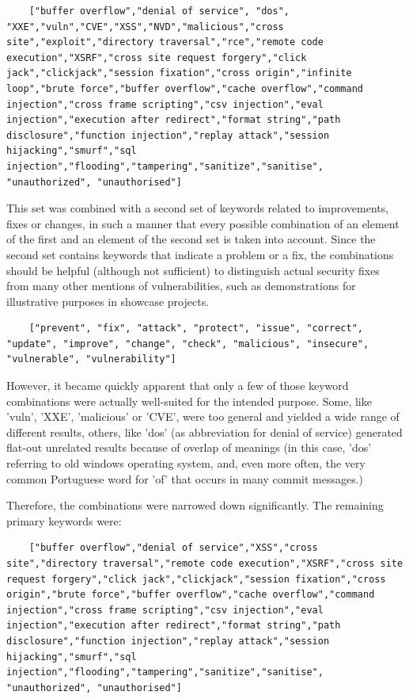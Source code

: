 \documentclass[
a4paper,
pagesize,
pdftex,
12pt,
ngerman,
fleqn,
final,
]{scrartcl}
\begin{document}
	\begin{lstlisting}
	["buffer overflow","denial of service", "dos", "XXE","vuln","CVE","XSS","NVD","malicious","cross site","exploit","directory traversal","rce","remote code execution","XSRF","cross site request forgery","click jack","clickjack","session fixation","cross origin","infinite loop","brute force","buffer overflow","cache overflow","command injection","cross frame scripting","csv injection","eval injection","execution after redirect","format string","path disclosure","function injection","replay attack","session hijacking","smurf","sql injection","flooding","tampering","sanitize","sanitise", "unauthorized", "unauthorised"]
	\end{lstlisting}
	This set was combined with a second set of keywords related to improvements, fixes or changes, in such a manner that every possible combination of an element of the first and an element of the second set is taken into account. Since the second set contains keywords that indicate a problem or a fix, the combinations should be helpful (although not sufficient) to distinguish actual security fixes from many other mentions of vulnerabilities, such as demonstrations for illustrative purposes in showcase projects.
	\begin{lstlisting}
	["prevent", "fix", "attack", "protect", "issue", "correct", "update", "improve", "change", "check", "malicious", "insecure", "vulnerable", "vulnerability"]
	\end{lstlisting}
	However, it became quickly apparent that only a few of those keyword combinations were actually well-suited for the intended purpose. Some, like 'vuln', 'XXE', 'malicious' or 'CVE', were too general and yielded a wide range of different results, others, like 'dos' (as abbreviation for denial of service) generated flat-out unrelated results because of overlap of meanings (in this case, 'dos' referring to old windows operating system, and, even more often, the very common Portuguese word for 'of' that occurs in many commit messages.)
	
	Therefore, the combinations were narrowed down significantly. The remaining primary keywords were:
	\begin{lstlisting}
	["buffer overflow","denial of service","XSS","cross site","directory traversal","remote code execution","XSRF","cross site request forgery","click jack","clickjack","session fixation","cross origin","brute force","buffer overflow","cache overflow","command injection","cross frame scripting","csv injection","eval injection","execution after redirect","format string","path disclosure","function injection","replay attack","session hijacking","smurf","sql injection","flooding","tampering","sanitize","sanitise", "unauthorized", "unauthorised"]
	\end{lstlisting}
	
\end{document}
